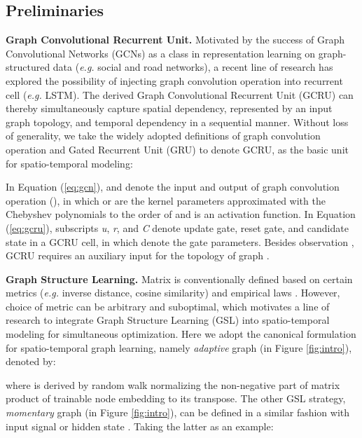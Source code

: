 \documentclass[letterpaper]{article} \usepackage{aaai23}  \usepackage{times}  \usepackage{helvet}  \usepackage{courier}  \usepackage[hyphens]{url}  \usepackage{graphicx} \urlstyle{rm} \def\UrlFont{\rm}  \usepackage{natbib}  \usepackage{caption} \usepackage{multirow}
\begin{document}
\subsection{Preliminaries}
\noindent\textbf{Graph Convolutional Recurrent Unit.} Motivated by the success of Graph Convolutional Networks (GCNs) as a class in representation learning on graph-structured data (\textit{e.g.} social and road networks), a recent line of research \cite{li2018diffusion, bai2020adaptive, shang2021discrete, ye2021coupled} has explored the possibility of injecting graph convolution operation into recurrent cell (\textit{e.g.} LSTM). The derived Graph Convolutional Recurrent Unit (GCRU) can thereby simultaneously capture spatial dependency, represented by an input graph topology, and temporal dependency in a sequential manner. Without loss of generality, we take the widely adopted definitions of graph convolution operation and Gated Recurrent Unit (GRU) to denote GCRU, as the basic unit for spatio-temporal modeling:



In Equation (\ref{eq:gcn}),  and  denote the input and output of graph convolution operation (), in which  or  are the kernel parameters approximated with the Chebyshev polynomials to the order of  \cite{defferrard2016convolutional} and  is an activation function. In Equation (\ref{eq:gcru}), subscripts \textit{u}, \textit{r}, and \textit{C} denote update gate, reset gate, and candidate state in a GCRU cell, in which  denote the gate parameters. Besides observation , GCRU requires an auxiliary input  for the topology of graph .

\noindent\textbf{Graph Structure Learning.} Matrix  is conventionally defined based on certain metrics (\textit{e.g.} inverse distance, cosine similarity) and empirical laws \cite{yu2018spatio, li2018diffusion, geng2019spatiotemporal}. However, choice of metric can be arbitrary and suboptimal, which motivates a line of research \cite{wu2020connecting, zhang2020spatio, shang2021discrete, bai2020adaptive, ye2021coupled} to integrate Graph Structure Learning (GSL) into spatio-temporal modeling for simultaneous optimization. Here we adopt the canonical formulation \cite{wu2019graph, bai2020adaptive, wang2022event} for spatio-temporal graph learning, namely \textit{adaptive} graph (in Figure \ref{fig:intro}), denoted by:

where  is derived by random walk normalizing the non-negative part of matrix product of trainable node embedding  to its transpose. The other GSL strategy, \textit{momentary} graph \cite{zhang2020spatio} (in Figure \ref{fig:intro}), can be defined in a similar fashion with input signal  or hidden state . Taking the latter as an example:
\end{document}
